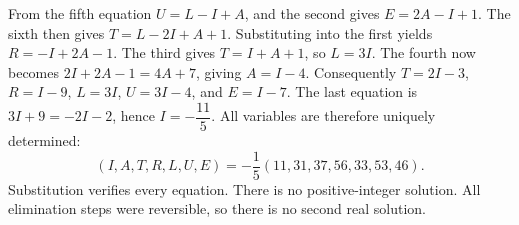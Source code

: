 From the fifth equation $U=L-I+A$, and the second gives $E=2A-I+1$. The sixth then gives $T=L-2I+A+1$. Substituting into the first yields $R=-I+2A-1$. The third gives $T=I+A+1$, so $L=3I$. The fourth now becomes $2I+2A-1=4A+7$, giving $A=I-4$. Consequently $T=2I-3$, $R=I-9$, $L=3I$, $U=3I-4$, and $E=I-7$. The last equation is $3I+9=-2I-2$, hence $I=-\dfrac{11}{5}$. All variables are therefore uniquely determined:
\[\boxed{(I,A,T,R,L,U,E)=-\dfrac{1}{5}(11,31,37,56,33,53,46)}.\]
Substitution verifies every equation. There is no positive-integer solution. All elimination steps were reversible, so there is no second real solution.
